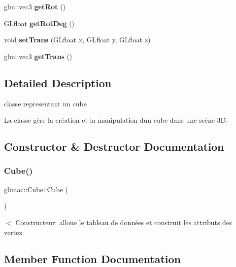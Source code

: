 \begin{DoxyCompactItemize}
glm\+::vec3 {\bfseries get\+Rot} ()
\item 
\mbox{\label{classglimac_1_1Cube_ad642ba1d2cd3727b861716275497c5f7}} 
G\+Lfloat {\bfseries get\+Rot\+Deg} ()
\item 
\mbox{\label{classglimac_1_1Cube_a98ab0f3b4ea21152fafe61b11dc09652}} 
void {\bfseries set\+Trans} (G\+Lfloat x, G\+Lfloat y, G\+Lfloat z)
\item 
\mbox{\label{classglimac_1_1Cube_a712b915cbe82f811229cedcb849e52fc}} 
glm\+::vec3 {\bfseries get\+Trans} ()
\end{DoxyCompactItemize}


\subsection{Detailed Description}
classe representant un cube 

La classe gère la création et la manipulation d\textquotesingle{}un cube dans une scène 3D. 

\subsection{Constructor \& Destructor Documentation}
\mbox{\label{classglimac_1_1Cube_a801f14f22e31defc97297ee0f3409856}} 
\subsubsection{\texorpdfstring{Cube()}{Cube()}}
{\footnotesize\ttfamily glimac\+::\+Cube\+::\+Cube (\begin{DoxyParamCaption}{ }\end{DoxyParamCaption})\hspace{0.3cm}{\ttfamily [inline]}}

$<$ Constructeur\+: alloue le tableau de données et construit les attributs des vertex 

\subsection{Member Function Documentation}
\mbox{\label{classglimac_1_1Cube_a90a46da5252a79df816f3289ff5910f3}} 
